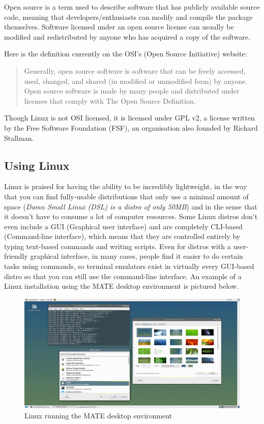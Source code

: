 Open source is a term used to describe software that has publicly available source code, meaning that developers/enthusiasts can modify and compile the package themselves. Software licensed under an open source license can usually be modified and redistributed by anyone who has acquired a copy of the software.

Here is the definition currently on the OSI's (Open Source Initiative) website:

\begin{quote}
Generally, open source software is software that can be freely accessed, used, changed, and shared (in modified or unmodified form) by anyone. Open source software is made by many people and distributed under licenses that comply with The Open Source Definition.
\end{quote}

Though Linux is not OSI licensed, it is licensed under GPL v2, a license written by the Free Software Foundation (FSF), an organisation also founded by Richard Stallman.

\hypertarget{using-linux}{%
\subsection{Using Linux}\label{using-linux}}

Linux is praised for having the ability to be incredibly lightweight, in the way that you can find fully-usable distributions that only use a minimal amount of space (\emph{Damn Small Linux (DSL) is a distro of only 50MB}) and in the sense that it doesn't have to consume a lot of computer resources. Some Linux distros don't even include a GUI (Graphical user interface) and are completely CLI-based (Command-line interface), which means that they are controlled entirely by typing text-based commands and writing scripts. Even for distros with a user-friendly graphical interface, in many cases, people find it easier to do certain tasks using commands, so terminal emulators exist in virtually every GUI-based distro so that you can still use the command-line interface. An example of a Linux installation using the MATE desktop environment is pictured below.

\begin{figure}
\includegraphics{./images/mate_desktop_example.png}
\caption{Linux running the MATE desktop environment}
\end{figure}

